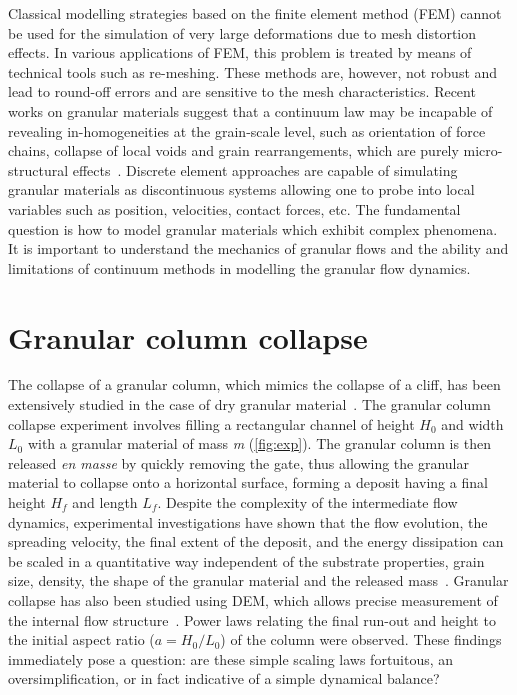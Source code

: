 Classical modelling strategies based on the finite element method (FEM) cannot 
be used for the simulation of very large deformations due to mesh distortion 
effects. In various applications of FEM, this problem is treated by means of 
technical 
tools such as re-meshing. These methods are, however, not robust and lead to 
round-off errors and are sensitive to the mesh characteristics. Recent works on 
granular materials suggest that a continuum law may be incapable of revealing 
in-homogeneities at 
the grain-scale level, such as orientation of force chains, collapse of local 
voids and grain rearrangements, which are purely micro-structural 
effects~\citep{Rycroft2009a}. Discrete element approaches 
are capable of simulating granular materials as discontinuous systems
allowing one to probe into local variables such as position, velocities, 
contact forces, etc. The fundamental question is how to model granular 
materials which exhibit complex phenomena. It is important to understand the 
mechanics of granular flows and the ability and limitations of continuum 
methods in modelling the granular flow dynamics. 

\section{Granular column collapse}
\label{sec:dry_granular_column}
The collapse of a granular column, which mimics the collapse of a cliff, has 
been extensively studied in the case of dry granular 
material~\citep{Lube2005,Lajeunesse2004,Kerswell2005,Zenit2005,Staron2007a,Hogg2007,Lo2009}.
The granular column collapse experiment involves filling a rectangular channel 
of height $H_0$ and width $L_0$ with a granular material of mass 
\textit{m} (\cref{fig:exp}). The granular column is then released \textit{en 
masse} by quickly removing the gate, thus allowing the granular material to 
collapse onto a horizontal surface, forming a deposit having a final height 
$H_f$ and length $L_f$. Despite the complexity of the intermediate flow 
dynamics, experimental investigations have shown that the flow evolution, the 
spreading velocity, the final extent of the deposit, and the energy dissipation 
can be scaled in a quantitative way independent of the substrate properties, 
grain size, density, the shape of the granular material and the released 
mass~\citep{Staron2007a,Lajeunesse2005,Lube2005}. Granular collapse has 
also been studied using DEM, which allows precise measurement of the internal 
flow structure~\citep{Lo2009,Staron2005,Staron2007a,Utili2014}. Power laws 
relating the final run-out and height to the initial aspect ratio ($a = H_0 / 
L_0$) of the column were observed. These findings immediately pose a question: 
are these simple scaling laws fortuitous, an oversimplification, or in fact 
indicative of a simple dynamical balance? 


